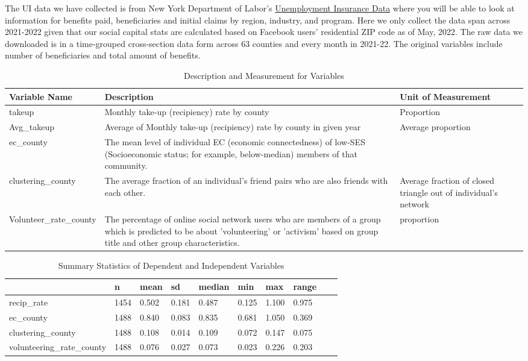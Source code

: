 \documentclass{article}
\begin{document}
The UI data we have collected is from New York Department of Labor's \href{https://dol.ny.gov/local-area-unemployment-statistics}{Unemployment Insurance Data} where you will be able to look at information for benefits paid, beneficiaries and initial claims by region, industry, and program. Here we only collect the data span across 2021-2022 given that our social capital stats are calculated based on Facebook users' residential ZIP code as of May, 2022. The raw data we downloaded is in a time-grouped cross-section data form across 63 counties and every month in 2021-22. The original variables include number of beneficiaries and total amount of benefits.



\begin{table}[h]
\centering
\begin{tabular}{|p{3.2cm}|p{8cm}|p{4cm}|}
\hline
\textbf{Variable Name} & \textbf{Description} & \textbf{ Unit of Measurement} \\ \hline
takeup & Monthly take-up (recipiency) rate by county & Proportion  \\ \hline
Avg\_takeup & Average of Monthly take-up (recipiency) rate by county in given year & Average proportion \\ \hline
ec\_county & The mean level of individual EC (economic connectedness) of low-SES (Socioeconomic status; for example, below-median) members of that community. &  \\ \hline
clustering\_county & The average fraction of an individual's friend pairs who are also friends with each other. & Average fraction of closed triangle out of individual's network \\ \hline
Volunteer\_rate\_county & The percentage of online social network users who are members of a group which is predicted to be about 'volunteering' or 'activism' based on group title and other group characteristics. & proportion \\ \hline
\end{tabular}
\caption{Description and Measurement for Variables}
\label{variablel descr}
\end{table}


\begin{table}


\centering
\begin{tabular}[h]{|m|m|m|m|m|m|m|m|m|m|}
\hline
  & n & mean & sd & median & min & max & range\\
\hline
recip\_rate & 1454 & 0.502 & 0.181 & 0.487 & 0.125 & 1.100 & 0.975\\
\hline
ec\_county & 1488 & 0.840 & 0.083 & 0.835 & 0.681 & 1.050 & 0.369\\
\hline
clustering\_county & 1488 & 0.108 & 0.014 & 0.109 & 0.072 & 0.147 & 0.075\\
\hline
volunteering\_rate\_county & 1488 & 0.076 & 0.027 & 0.073 & 0.023 & 0.226 & 0.203\\
\hline
\end{tabular}
\caption{Summary Statistics of Dependent and Independent Variables}
\end{table}
\end{document}
